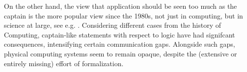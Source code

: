 \documentclass[]{article}
\begin{document}
On the other hand, the view that application should be seen too much as the captain is the more popular view since the 1980s, not just in computing, but in science at large, see e.g. \cite{forman}. Considering different cases from the history of Computing,  captain-like statements with respect to logic have had signifcant consequences,  intensifying certain communication gaps. Alongside such gaps, physical computing systems seem to remain opaque, despite the (extensive or entirely missing) effort of formalization.





\end{document}
